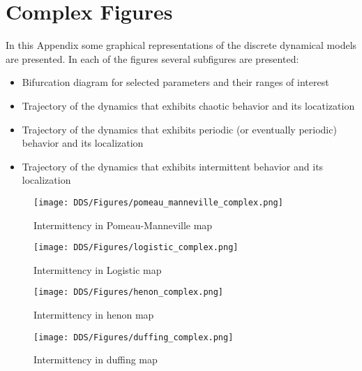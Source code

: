 \chapter{Complex Figures}
\label{sec:Appendix_complex_figures}
In this Appendix some graphical representations of the discrete dynamical models are presented.
In each of the figures several subfigures are presented:
\begin{itemize}
  \item Bifurcation diagram for selected parameters and their ranges of interest
  \item Trajectory of the dynamics that exhibits chaotic behavior and its locatization
  \item Trajectory of the dynamics that exhibits periodic (or eventually periodic) behavior and its localization
  \item Trajectory of the dynamics that exhibits intermittent behavior and its localization
\end{itemize}

\begin{figure}[!ht]
	\centering
	\texttt{[image: DDS/Figures/pomeau\_manneville\_complex.png]}
	\caption{Intermittency in Pomeau-Manneville map}
	\label{fig:complex_pomeau_manneville}
\end{figure}

\begin{figure}[!ht]
	\centering
	\texttt{[image: DDS/Figures/logistic\_complex.png]}
	\caption{Intermittency in Logistic map}
	\label{fig:complex_logistic}
\end{figure}

\begin{figure}[!ht]
	\centering
	\texttt{[image: DDS/Figures/henon\_complex.png]}
	\caption{Intermittency in henon map}
	\label{fig:complex_henon}
\end{figure}

\begin{figure}[!ht]
	\centering
	\texttt{[image: DDS/Figures/duffing\_complex.png]}
	\caption{Intermittency in duffing map}
	\label{fig:complex_duffing}
\end{figure}

\endinput
